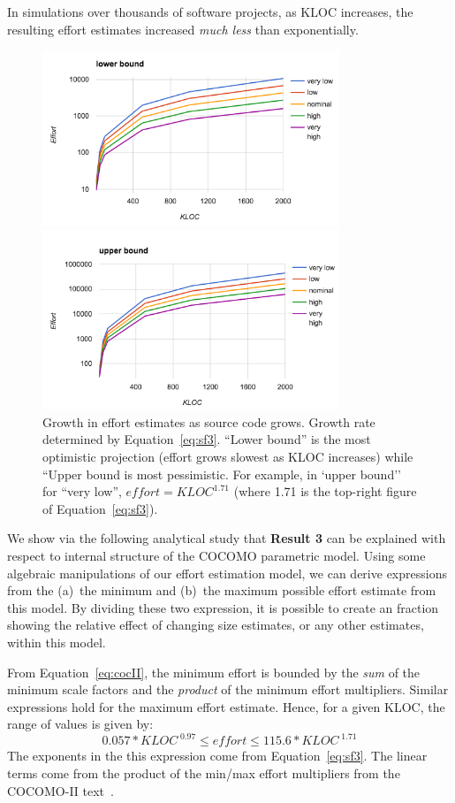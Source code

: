 \documentclass[final,twocolumn]{elsarticle}
\newcommand{\eq}[1]{Equation~\ref{eq:#1}}
\theoremstyle{break}
\begin{document}
\begin{lesson}
  In simulations over thousands of software projects,
  as KLOC increases, the resulting effort estimates increased {\em much less} than exponentially.
\end{lesson}


\begin{figure}[!t] 
\includegraphics[width=3.5in]{Figs/lower.png}


\includegraphics[width=3.5in]{Figs/upper.png} 
\caption{Growth in effort estimates as source code grows. Growth rate determined by \eq{sf3}. 
``Lower bound'' is the most optimistic projection (effort grows slowest as KLOC increases)
while ``Upper bound is most pessimistic.
For example, in `upper bound'' for ``very low'', $\mathit{effort} = \mathit{KLOC}^{1.71}$ (where 1.71 is the top-right figure of \eq{sf3}). }\label{fig:lowerupper}
\end{figure}
 

We show via the following analytical study 
that {\bf Result 3} can be explained with respect to internal structure
of the COCOMO parametric model. Using some algebraic manipulations of
our effort estimation model,
we can derive expressions from
 the (a)~the minimum and (b)~the
maximum possible effort estimate from this model.
By dividing these two expression, it is possible to create an fraction showing
the relative effect of changing size estimates, or any other estimates, within this model.


From \eq{cocII},
the minimum  
effort  is bounded by the  {\em sum} of the minimum scale factors
and the {\em product} of the minimum effort multipliers.
Similar expressions hold for the  maximum effort estimate. Hence,
for a given KLOC, the range of values is given by:
\[
0.057*\mathit{KLOC}^{\;0.97}  \le \mathit{effort} \le 115.6*\mathit{KLOC}^{\;1.71}\]
The exponents in the this expression come from \eq{sf3}. The linear terms come
from the product of the min/max effort multipliers from the 
 COCOMO-II text~\cite{boehm00b}.
\end{document}
